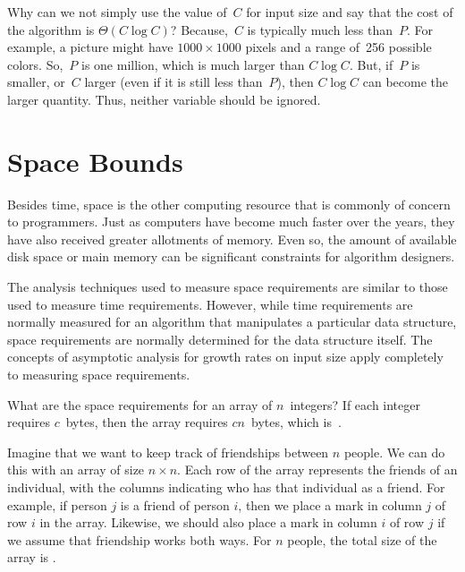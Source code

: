 Why can we not simply use the value of~\(C\) for input size and say
that the cost of the algorithm is \(\Theta(C \log C)\)?
Because,~\(C\) is typically much less than~\(P\).
For example, a picture might have \(1000 \times 1000\) pixels and
a range of~256 possible colors.
So,~\(P\) is one million, which is much larger than \(C \log C\).
But, if~\(P\) is smaller, or~\(C\) larger (even if it is still less
than~\(P\)), then \(C \log C\) can become the larger quantity.
Thus, neither variable should be ignored.

\section{Space Bounds}
\label{SpaceBounds}

Besides time, space is the other computing resource that is commonly
of concern to programmers.
Just as computers have become much faster over the years, they have
also received greater allotments of memory.
Even so, the amount of available disk space or main memory can
be significant constraints for algorithm designers.

The analysis techniques used to measure space requirements are
similar to those used to measure time requirements.
However, while time requirements are normally measured for an
algorithm that manipulates a particular data structure,
space requirements are normally determined for the data structure
itself.
The concepts of asymptotic analysis for growth rates
on input size apply completely to measuring space requirements.

\begin{example}
What are the space requirements for an array of \(n\)~integers?
If each integer requires \(c\)~bytes, then the array requires
\(cn\)~bytes, which is~\Thetan.
\end{example}

\begin{example}
Imagine that we want to keep track of friendships between \(n\) people.
We can do this with an array of size \(n \times n\).
Each row of the array represents the friends of an individual, with
the columns indicating who has that individual as a friend.
For example, if person \(j\) is a friend of person \(i\), then we
place a mark in column \(j\) of row \(i\) in the array.
Likewise, we should also place a mark in column \(i\) of row \(j\)
if we assume that friendship works both ways.
For \(n\) people, the total size of the array is \Thetantwo.
\end{example}

